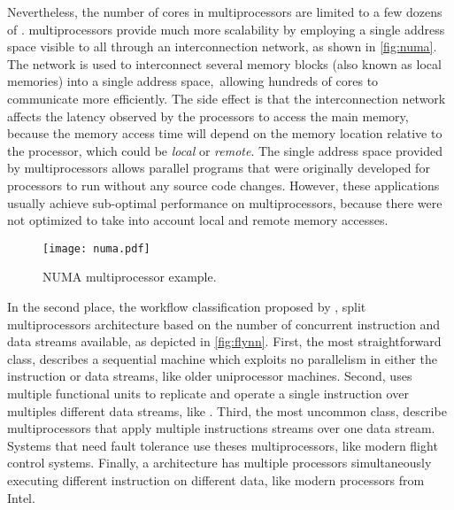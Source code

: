 			Nevertheless, the number of cores in \uma multiprocessors are limited
			to a few dozens of \cpus.
			\numa multiprocessors provide much more scalability by employing a single
			address space visible to all \cpus through an interconnection network, as 
			shown in \autoref{fig:numa}. The network is used to interconnect
			several memory blocks (also known as local memories) into a single address space,\
			allowing hundreds of cores to communicate more efficiently. The side effect is that
			the interconnection network affects the latency observed by the processors to access
			the main memory, because the memory access time will depend on the memory location 
			relative to the processor, which could be \textit{local} or \textit{remote}.			
			The single address space provided by \numa multiprocessors
			allows parallel programs that were originally developed for \uma processors to
			run without any source code changes. However, these applications usually achieve
			sub-optimal performance on \numa multiprocessors, because there were not optimized
			to take into account local and remote memory accesses. 

			\begin{figure}[!tb]
				\centering%
				\caption{NUMA multiprocessor example.}%
				\label{fig:numa}%
				\texttt{[image: numa.pdf]}%
			\end{figure}

			In the second place, the workflow classification proposed by ,
			split multiprocessors architecture based on the number of concurrent
			instruction and data streams available, as depicted in \autoref{fig:flynn}.
			First, the most straightforward class, \sisd describes a sequential
			machine which exploits no parallelism in either the instruction or
			data streams, like older uniprocessor machines.
			Second, \simd uses multiple functional units to replicate and operate
			a single instruction over multiples different data streams, like \gpu.
			Third, the most uncommon class, \misd describe multiprocessors that
			apply multiple instructions streams over one data stream.
			Systems that need fault tolerance use theses multiprocessors, like
			modern flight control systems.
			Finally, a  architecture has multiple processors simultaneously
			executing different instruction on different data, like
			modern processors from Intel.

